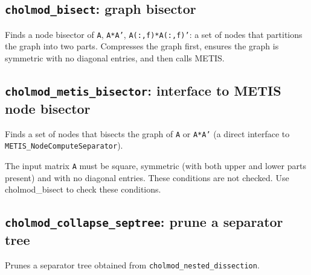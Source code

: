 \documentclass[11pt]{article}
\begin{document}
\newpage
\subsection{{\tt cholmod\_bisect}: graph bisector}


Finds a node bisector of {\tt A}, {\tt A*A'}, {\tt A(:,f)*A(:,f)'}:
a set of nodes that partitions the graph into two parts.
Compresses the graph first, ensures the graph is symmetric with
no diagonal entries, and then calls METIS.

\subsection{{\tt cholmod\_metis\_bisector}: interface to METIS node bisector}


Finds a set of nodes that bisects the graph of {\tt A} or {\tt A*A'} (a direct interface to \newline
{\tt METIS\_NodeComputeSeparator}).

The input matrix {\tt A} must be square, symmetric (with both upper and lower
parts present) and with no diagonal entries.  These conditions are not
checked.  Use cholmod\_bisect to check these conditions.

\newpage
\subsection{{\tt cholmod\_collapse\_septree}: prune a separator tree}


Prunes a separator tree obtained from {\tt cholmod\_nested\_dissection}.

\newpage


\end{document}
